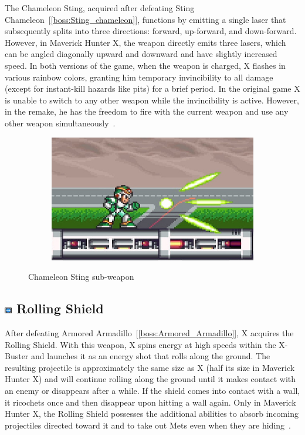The Chameleon Sting, acquired after defeating Sting Chameleon~[\ref{boss:Sting_chameleon}], functions by emitting a single laser that subsequently splits into three directions: forward, up-forward, and down-forward. However, in Maverick Hunter X, the weapon directly emits three lasers, which can be angled diagonally upward and downward and have slightly increased speed. In both versions of the game, when the weapon is charged, X flashes in various rainbow colors, granting him temporary invincibility to all damage (except for instant-kill hazards like pits) for a brief period. In the original game X is unable to switch to any other weapon while the invincibility is active. However, in the remake, he has the freedom to fire with the current weapon and use any other weapon simultaneously~\cite{wiki:Chameleon_sting}. 
\begin{figure}[htp]
	\centering
	\begin{subfigure}{0.35\linewidth}
		\includegraphics[width=\linewidth]{figures/X1/weapons/Chameleon_sting.jpg}
	\end{subfigure}
	\caption{Chameleon Sting sub-weapon}
\end{figure}

\subsection{\includegraphics[width=12px, height=10px]{figures/X1/weapons/Rolling_S.jpg} Rolling Shield}\label{Rolling_shield}
After defeating Armored Armadillo~[\ref{boss:Armored_Armadillo}], X acquires the Rolling Shield. With this weapon, X spins energy at high speeds within the X-Buster and launches it as an energy shot that rolls along the ground. The resulting projectile is approximately the same size as X (half its size in Maverick Hunter X) and will continue rolling along the ground until it makes contact with an enemy or disappears after a while. If the shield comes into contact with a wall, it ricochets once and then disappear upon hitting a wall again. Only in Maverick Hunter X, the Rolling Shield possesses the additional abilities to absorb incoming projectiles directed toward it and to take out Mets even when they are hiding~\cite{wiki:Rolling_shield}. 

